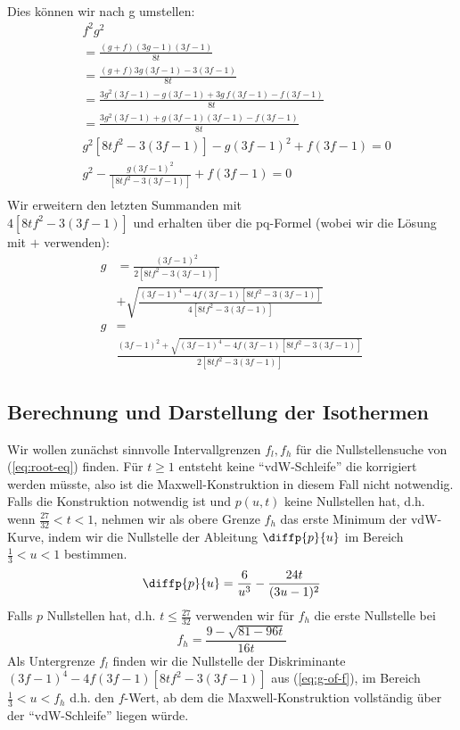 \documentclass[10pt]{article}
\begin{document}
\begin{multicols}{2}
\begin{align}
  \end{align}
  Dies können wir nach g umstellen:
  \begin{align*}
    &f^2g^2 \\
    &= \frac{ (g+f)(3g-1)(3f-1) }{8t} \\
    &= \frac{ (g+f)3g(3f-1)-3(3f-1) }{8t} \\
    &= \frac{ 3g^2(3f-1) - g(3f-1) + 3g\,f(3f-1) - f(3f-1) }{8t} \\
    &= \frac{ 3g^2(3f-1) + g(3f-1)(3f-1) - f(3f-1) }{8t} \\
    &g^2[8tf^2 - 3(3f-1)] - g(3f-1)^2 + f(3f-1) = 0 \\
    &g^2 - \frac{g(3f-1)^2}{[8tf^2 - 3(3f-1)]} + f(3f-1) = 0 \\
  \end{align*}
  Wir erweitern den letzten Summanden mit \\ $4[8tf^2 - 3(3f-1)]$ und erhalten über die pq-Formel (wobei wir die Lösung mit $+$ verwenden):
  \begin{align}
    g &= \frac{(3f-1)^2}{2[8tf^2 - 3(3f-1)]} \nonumber \\
    &+ \sqrt{\frac{ (3f-1)^4-4f(3f-1)[8tf^2 - 3(3f-1)] }{4[8tf^2 - 3(3f-1)]}} \nonumber \\
    g &= \label{eq:g-of-f}\\
    &\frac{(3f-1)^2 + \sqrt{(3f-1)^4-4f(3f-1)[8tf^2 - 3(3f-1)]}}{2[8tf^2 - 3(3f-1)]} \nonumber
  \end{align}

  \subsection{Berechnung und Darstellung der Isothermen} %
  Wir wollen zunächst sinnvolle Intervallgrenzen $f_l, f_h$ für die Nullstellensuche von (\ref{eq:root-eq}) finden.
  Für $t \geq 1$ entsteht keine \enquote{vdW-Schleife} die korrigiert werden müsste, also ist die Maxwell-Konstruktion in diesem Fall nicht notwendig.
  Falls die Konstruktion notwendig ist und $p(u, t)$ keine Nullstellen hat, d.h. wenn $\frac{27}{32}<t<1$, nehmen wir als obere Grenze $f_h$ das erste Minimum der vdW-Kurve,
  indem wir die Nullstelle der Ableitung $\diffp{p}{u}$ im Bereich $\frac{1}{3} < u < 1$ bestimmen. 
  \begin{equation}
    \diffp{p}{u} = \frac{6}{u^3} - \frac{24t}{(3u-1)^2} 
  \end{equation}
  Falls $p$ Nullstellen hat, d.h. $t \leq \frac{27}{32}$ verwenden wir für $f_h$ die erste Nullstelle bei
  \begin{equation}
    f_h = \frac{9-\sqrt{81-96t}}{16t}
  \end{equation}
  Als Untergrenze $f_l$ finden wir die Nullstelle der Diskriminante $(3f-1)^4-4f(3f-1)[8tf^2 - 3(3f-1)]$ aus (\ref{eq:g-of-f}),
  im Bereich $\frac{1}{3} < u < f_h$ d.h. den $f$-Wert, ab dem die Maxwell-Konstruktion vollständig über der \enquote{vdW-Schleife} liegen würde.
  


\end{multicols}
\end{document}
